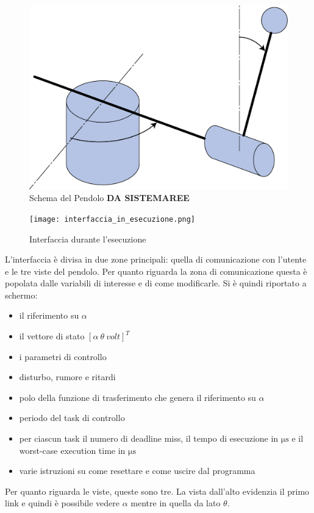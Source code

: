 \label{sez:interfaccia}

\begin{figure}[]
	\centering
	\includegraphics[width=.7\linewidth]{schema_2.pdf}
	\caption{Schema del Pendolo \textbf{DA SISTEMAREE}}
	\label{fig:pendolo_schema}
\end{figure}

\begin{figure}[]
	\centering
	\texttt{[image: interfaccia\_in\_esecuzione.png]}
	\caption{Interfaccia durante l'esecuzione}
	\label{fig:interfaccia_in_esecuzione}
\end{figure}
L'interfaccia \`e divisa in due zone principali: quella di comunicazione con l'utente e le tre viste del pendolo.
Per quanto riguarda la zona di comunicazione questa \`e popolata dalle variabili di interesse e di come modificarle. Si \`e quindi riportato a schermo:
\begin{itemize}
	\item il riferimento su $\alpha$
	
	\item  il vettore di stato $\left[ \alpha \ \theta \ volt\right]^T$
	
	\item i parametri di controllo
	
	\item disturbo, rumore e ritardi
	
	\item polo della funzione di trasferimento che genera il riferimento su $\alpha$
	
	\item periodo del task di controllo
	
	\item per ciascun task il numero di deadline miss, il tempo di esecuzione in $\si{\micro \second}$ e il worst-case execution time in $\si{\micro \second}$
	
	\item varie istruzioni su come resettare e come uscire dal programma
	
\end{itemize}
Per quanto riguarda le viste, queste sono tre. La vista dall'alto evidenzia il primo link e quindi \`e possibile vedere $\alpha$ mentre in quella da lato $\theta$.

